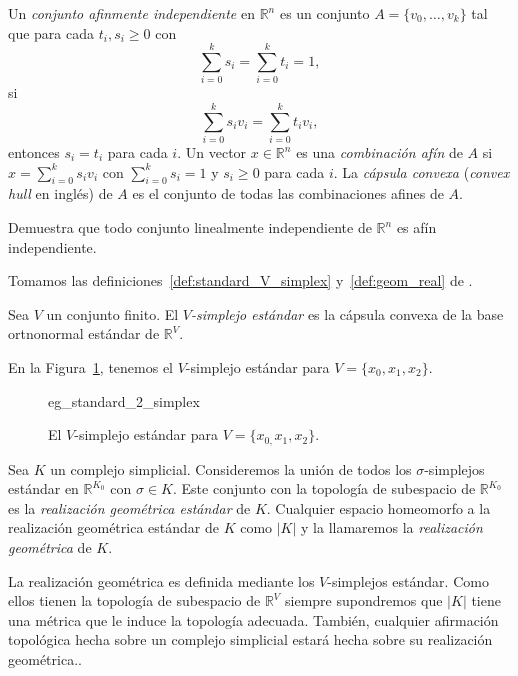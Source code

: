 \documentclass{standalone}
\begin{document}
	\begin{definition}\label{def:affine_ind_set}
		Un \emph{conjunto afinmente independiente} en $\mathbb{R}^{n}$ es un conjunto $A=\{v_{0},\ldots,v_{k}\}$ tal que para cada $t_{i},s_{i}\geq0$ con 
		\[
		\sum_{i=0}^{k}s_{i}=\sum_{i=0}^{k}t_{i}=1,
		\]si 
		\[
		\sum_{i=0}^{k}s_{i}v_{i}=\sum_{i=0}^{k}t_{i}v_{i},
		\]entonces $s_{i}=t_{i}$ para cada $i$. Un vector $x\in\mathbb{R}^{n}$ es una \emph{combinación afín} de $A$ si $x=\sum_{i=0}^{k}s_{i}v_{i}$ con $\sum_{i=0}^{k}s_{i}=1$ y $s_{i}\geq0$ para cada $i$. La \emph{cápsula convexa} (\emph{convex hull} en inglés) de $A$ es el conjunto de todas las combinaciones afines de $A$.
	\end{definition}
	
	\begin{exercise}
		Demuestra que todo conjunto linealmente independiente de $\mathbb{R}^{n}$ es afín independiente.
	\end{exercise}
	
	Tomamos las definiciones~\ref{def:standard_V_simplex} y~\ref{def:geom_real} de \cite[Section 2.2.1]{kozlov:2008:combinatorial:alg:topo}.
	
	\begin{definition}\label{def:standard_V_simplex}
		Sea $V$ un conjunto finito. El \emph{$V$-simplejo estándar} es la cápsula convexa de la base ortnonormal estándar de $\mathbb{R}^{V}$. 
	\end{definition}
	En la Figura~\ref{fig:eg_standard_2_simplex}, tenemos el $V$-simplejo estándar para $V=\{x_{0},x_{1},x_{2}\}$. 
	\begin{figure}
		\centering
		{eg_standard_2_simplex}
		\caption{El $V$-simplejo estándar para $V=\{x_{0,}x_{1},x_{2}\}$.}
		\label{fig:eg_standard_2_simplex}
	\end{figure}
	
	\begin{definition}\label{def:geom_real}
		Sea $K$ un complejo simplicial. Consideremos la unión de todos los $\sigma$-simplejos estándar en $\mathbb{R}^{K_{0}}$ con $\sigma\in K$. Este conjunto con la topología de subespacio de $\mathbb{R}^{K_{0}}$ es la \emph{realización geométrica estándar} de $K$.  Cualquier espacio homeomorfo a la realización geométrica estándar de $K$ como $|K|$ y la llamaremos la \emph{realización geométrica} de $K$.
	\end{definition}
	
	\begin{remark}\label{rem:geom_realization}
		La realización geométrica es definida mediante los $V$-simplejos estándar. Como ellos tienen la topología de subespacio de $\mathbb{R}^{V}$ siempre supondremos que $|K|$ tiene una métrica que le induce la topología adecuada. También, cualquier afirmación topológica hecha sobre un complejo simplicial estará hecha sobre su realización geométrica..
	\end{remark}
	
\end{document}
